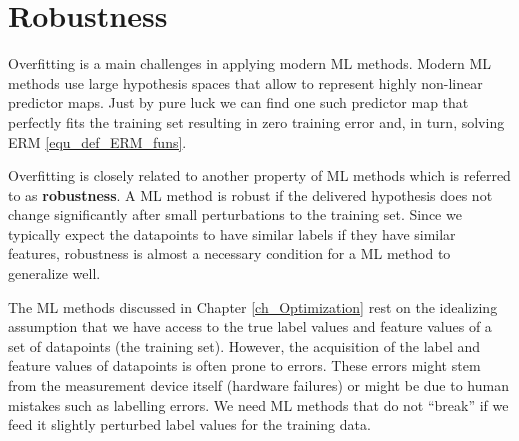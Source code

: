 \documentclass[12pt]{report}
\begin{document}


\section{Robustness} 
\label{sec_robustness} 

Overfitting is a main challenges in applying modern ML methods. 
Modern ML methods use large hypothesis spaces that allow to 
represent highly non-linear predictor maps. Just by pure luck 
we can find one such predictor map that perfectly fits the 
training set resulting in zero training error and, in turn, solving 
ERM \eqref{equ_def_ERM_funs}. 

Overfitting is closely related to another property of ML methods which 
is referred to as {\bf robustness}. A ML method is robust if the delivered 
hypothesis does not change significantly after small perturbations to 
the training set. Since we typically expect the datapoints to have similar 
labels if they have similar features, robustness is almost a necessary condition for 
a ML method to generalize well. 

The ML methods discussed in Chapter \ref{ch_Optimization} rest on the 
idealizing assumption that we have access to the true label values and feature 
values of a set of datapoints (the training set). However, the acquisition of 
the label and feature values of datapoints is often prone to errors. These 
errors might stem from the measurement device itself (hardware failures) 
or might be due to human mistakes such as labelling errors. We need ML 
methods that do not ``break'' if we feed it slightly perturbed label values 
for the training data. 
\end{document}
